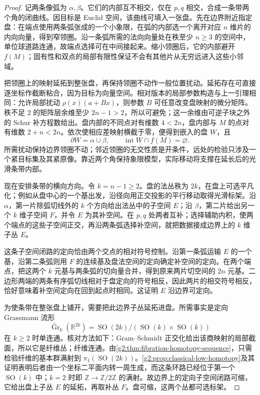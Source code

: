 \begin{proof}
	记两条像弧为 \(\alpha,\beta\)。它们的内部互不相交，仅在 \(p,q\) 相交，合成一条带两个角的闭曲线。因目标是 Euclid 空间，该曲线可填入一张盘。先在边界附近指定盘：在端点使用两条弧张成的一个小象限，在弧的内部选一个离开对应 \(n\) 维片的内向向量，得到窄领圈。沿一条弧所需的法向向量处在秩至少 \(n\ge3\) 的空间中，单位球道路连通，故端点选择可在中间接起来。缩小领圈后，它的内部避开 \(f(M)\)；固有性和双点的局部有限性保证不会有其他片从无穷远进入这些小邻域。

	把领圈上的映射延拓到整张盘，再保持领圈不动作一般位置扰动。延拓存在可直接逐坐标作截断粘合，因为目标为向量空间。相对版本的局部参数构造与上一引理相同：允许局部扰动 \(\rho(x)(a+Bx)\)，则参数 \(B\) 可任意改变盘映射的微分矩阵。秩不足 \(2\) 的矩阵层余维至少 \(2n-1>2\)，所以可避免；这一余维由可逆子块之外的 Schur 补方程数给出。盘内部的不同点对有维数 \(4<2n\)，盘内部与 \(M\) 的点对有维数 \(2+n<2n\)。依次使相应差映射横截于零，便得到嵌入的盘 \(W\)，且
	\[
		\partial W=\alpha\cup\beta,\qquad \operatorname{int}W\cap f(M)=\varnothing.
	\]
	所需扰动保持边界领圈不动；邻近领圈的无交性质是开条件，远处的检验只涉及一个紧目标集及其紧原像。靠近两个角保持象限模型，实际移动将支撑在延长后的光滑条带内部。

	现在安排条带的横向方向。令 \(k=n-1\ge2\)。盘的法丛秩为 \(2k\)，在盘上可选平凡化；例如从盘中心的一个基出发，沿径向用正交投影的平行移动取得光滑标架。沿 \(\alpha\)，第一片除弧切线外的 \(k\) 个方向给出法丛中的子空间 \(E\)；沿 \(\beta\)，第二片给出另一个 \(k\) 维子空间 \(F\)，并令 \(E\) 为其补空间。在 \(p,q\) 处两者互补；选择辅助内积，使两个端点的这些子空间正交，再沿两条弧选择补空间，就把数据接成边界上的 \(k\) 维子丛 \(E\)。

	这条子空间闭路的定向恰由两个交点的相对符号控制。沿第一条弧运输 \(E\) 的一个基，沿第二条弧则用 \(F\) 的连续基及盘法空间的定向确定补空间的定向。在两个端点，把这两个 \(k\) 元基与两条弧的切向量合并，得到原来两片切空间的 \(2n\) 元基。二边形两端的两条有序弧切线相对于盘定向的符号相反，因此两片的相交符号相反，恰好意味着补空间定向在回到起点时相同。这证明 \(E\) 沿边界可定向。

	为使条带在整张盘上铺开，需要把此边界子丛延拓进盘。所需事实是定向 Grassmann 流形
	\[
		\widetilde{\operatorname{Gr}}_k(\mathbb R^{2k})
		=\operatorname{SO}(2k)/(\operatorname{SO}(k)\times\operatorname{SO}(k))
	\]
	在 \(k\ge2\) 时单连通。核对方法如下：Gram--Schmidt 正交化给出该商映射的局部截面，所以它是纤维丛；纤维连通。由\cref{g2:thm:fibration-homotopy-sequence}，只需检验纤维的基本群满射到 \(\pi_1(\operatorname{SO}(2k))\)。\cref{g2:prop:classical-low-homotopy}及其证明表明后者由一个坐标二平面内转一周生成，而这条环路已经位于第一个 \(\operatorname{SO}(k)\) 中；\(k=2\) 时即 \(\mathbb Z\to\mathbb Z/2\mathbb Z\) 的满射。故边界上的定向子空间闭路可缩，它给出盘上子丛 \(E\) 的延拓，再取补丛 \(F\)。盘可缩，这两个丛都可选标架。


\end{proof}
